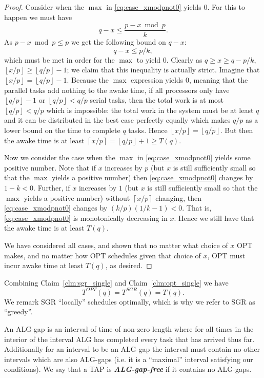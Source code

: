 \documentclass[twocolumn]{article}[10pt]
\newcommand{\defn}[1]{{\textit{\textbf{\boldmath #1}}}\xspace}
\newcommand{\floor}[1]{\left\lfloor #1 \right\rfloor}
\newcommand{\ceil}[1]{\left\lceil #1 \right\rceil}
\begin{document}
\begin{proof}
  Consider when the $\max$ in \eqref{eq:case_xmodpnot0} yields $0$. 
  For this to happen we must have
  $$q-x \le \frac{p-x\bmod p}{k}.$$
  As $p-x\bmod p \le p$ we get the following bound on $q-x$:
  $$q-x \le p/k,$$
  which must be met in order for the $\max$ to yield $0$.
  Clearly as $q \ge x \ge q-p/k$, $\floor{x/p} \ge \floor{q/p}-1$; we
  claim that this inequality is actually strict. Imagine that
  $\floor{x/p} = \floor{q/p}-1$. Because the $\max$ expression
  yields $0$, meaning that the parallel tasks add nothing to the
  awake time, if all processors only have $\floor{q/p}-1$ or
  $\floor{q/p} < q/p$ serial tasks, then the total work is at
  most $\floor{q/p} < q/p$ which is impossible: the total work in
  the system must be at least $q$ and it can be distributed in
  the best case perfectly equally which makes $q/p$ as a lower
  bound on the time to complete $q$ tasks. Hence $\floor{x/p} = \floor{q/p}$. 
  But then the awake time is at least $\ceil{x/p} = \floor{q/p} + 1 \ge T(q)$.

  Now we consider the case when the $\max$ in
  \eqref{eq:case_xmodpnot0} yields some positive number.
  Note that if $x$ increases by $p$ (but $x$ is still
  sufficiently small so that the $\max$ yields a positive number)
  then \eqref{eq:case_xmodpnot0} changes by $1-k < 0$.
  Further, if $x$ increases by $1$ (but $x$ is still
  sufficiently small so that the $\max$ yields a positive number) without $\ceil{x/p}$
  changing, then \eqref{eq:case_xmodpnot0} changes by $(k/p)(1/k
  -1) < 0$. That is, \eqref{eq:case_xmodpnot0} is monotonically
  decreasing in $x$. Hence we still have that the awake time is at least $T(q).$

  We have considered all cases, and shown that no matter what
  choice of $x$ OPT makes, and no matter how OPT schedules given
  that choice of $x$, OPT must incur awake time at least $T(q)$,
  as desired.
\end{proof}

Combining Claim~\ref{clm:sgr_single} and
Claim~\ref{clm:opt_single} we have
\begin{equation}
  \label{eq:same_single}
  T^{OPT}(q) = T^{SGR}(q) = T(q).
\end{equation}
We remark SGR \enquote{locally} schedules optimally, which is
why we refer to SGR as \enquote{greedy}. 

An ALG-gap is an interval of time of non-zero length where for
all times in the interior of the interval ALG has completed every
task that has arrived thus far. Additionally for an interval to
be an ALG-gap the interval must contain no other intervals which
are also ALG-gaps (i.e. it is a \enquote{maximal} interval
satisfying our conditions).
We say that a TAP is \defn{ALG-gap-free} if it contains no ALG-gaps.
\end{document}
